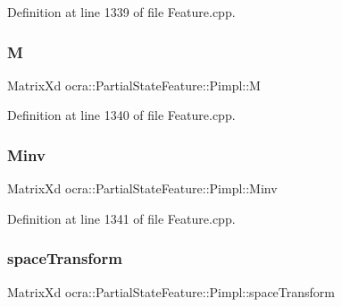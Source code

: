 Definition at line 1339 of file Feature.\+cpp.

\hypertarget{structocra_1_1PartialStateFeature_1_1Pimpl_a72c1103a7217a32b0c3a987ee55ae4b8}{}\label{structocra_1_1PartialStateFeature_1_1Pimpl_a72c1103a7217a32b0c3a987ee55ae4b8} 
\subsubsection{\texorpdfstring{M}{M}}
{\footnotesize\ttfamily Matrix\+Xd ocra\+::\+Partial\+State\+Feature\+::\+Pimpl\+::M}



Definition at line 1340 of file Feature.\+cpp.

\hypertarget{structocra_1_1PartialStateFeature_1_1Pimpl_a7e2b177fca112bbeb8055361c90d333e}{}\label{structocra_1_1PartialStateFeature_1_1Pimpl_a7e2b177fca112bbeb8055361c90d333e} 
\subsubsection{\texorpdfstring{Minv}{Minv}}
{\footnotesize\ttfamily Matrix\+Xd ocra\+::\+Partial\+State\+Feature\+::\+Pimpl\+::\+Minv}



Definition at line 1341 of file Feature.\+cpp.

\hypertarget{structocra_1_1PartialStateFeature_1_1Pimpl_aadd03df1276aa00d2efd8679c5cecb1a}{}\label{structocra_1_1PartialStateFeature_1_1Pimpl_aadd03df1276aa00d2efd8679c5cecb1a} 
\subsubsection{\texorpdfstring{space\+Transform}{spaceTransform}}
{\footnotesize\ttfamily Matrix\+Xd ocra\+::\+Partial\+State\+Feature\+::\+Pimpl\+::space\+Transform}



